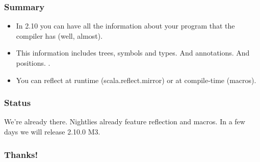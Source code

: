 \documentclass[hyperref={bookmarks=false}]{beamer}
\begin{document}
\begin{frame}[fragile]
\frametitle{Summary}

\begin{itemize}
\item In 2.10 you can have all the information about your program that the compiler has (well, almost).
\item This information includes trees, symbols and types. And annotations. And positions.
.
\item You can reflect at runtime (scala.reflect.mirror) or at compile-time (macros).
\end{itemize}
\end{frame}

\begin{frame}[fragile]
\frametitle{Status}

We're already there. Nightlies already feature reflection and macros.
In a few days we will release 2.10.0 M3.

\end{frame}

\begin{frame}[fragile]
\frametitle{Thanks!}

\centering
{}

\end{frame}
\end{document}
